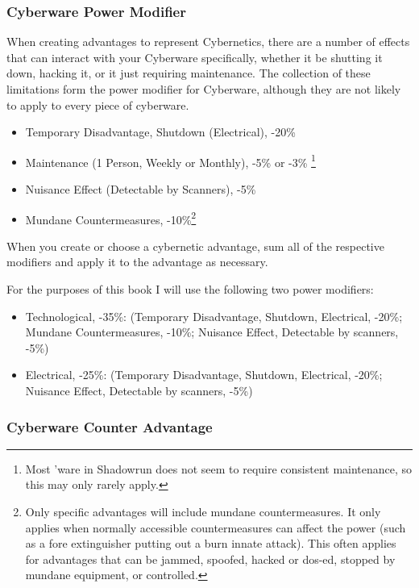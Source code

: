 \begin{multicols*}{3}
	\subsubsection{Cyberware Power Modifier}
	
	When creating advantages to represent Cybernetics, there are a number of effects that can interact with your Cyberware specifically, whether it be shutting it down, hacking it, or it just requiring maintenance. The collection of these limitations form the power modifier for Cyberware, although they are not likely to apply to every piece of cyberware.
	
	\begin{itemize}
		\item Temporary Disadvantage, Shutdown (Electrical), -20\%
		\item Maintenance (1 Person, Weekly or Monthly), -5\% or -3\% \footnote{Most 'ware in Shadowrun does not seem to require consistent maintenance, so this may only rarely apply.}
		\item Nuisance Effect (Detectable by Scanners), -5\%
		\item Mundane Countermeasures, -10\%\footnote{Only specific advantages will include mundane countermeasures. It only applies when normally accessible countermeasures can affect the power (such as a fore extinguisher putting out a burn innate attack). This often applies for advantages that can be jammed, spoofed, hacked or dos-ed, stopped by mundane equipment, or controlled.}
	\end{itemize}
	
	When you create or choose a cybernetic advantage, sum all of the respective modifiers and apply it to the advantage as necessary.
	
	For the purposes of this book I will use the following two power modifiers:
	
	\begin{itemize}
		\item Technological, -35\%: (Temporary Disadvantage, Shutdown, Electrical,  -20\%; Mundane Countermeasures, -10\%; Nuisance Effect, Detectable by scanners, -5\%)
		\item Electrical, -25\%: (Temporary Disadvantage, Shutdown, Electrical, -20\%; Nuisance Effect, Detectable by scanners, -5\%)
	\end{itemize}
	
	\subsubsection{Cyberware Counter Advantage}
	

\end{multicols*}
